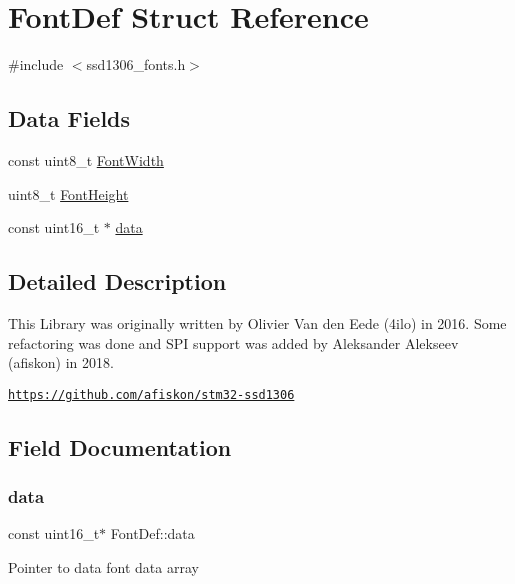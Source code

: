 \hypertarget{struct_font_def}{}\section{Font\+Def Struct Reference}
\label{struct_font_def}


{\ttfamily \#include $<$ssd1306\+\_\+fonts.\+h$>$}

\subsection*{Data Fields}
\begin{DoxyCompactItemize}
\item 
const uint8\+\_\+t \hyperlink{struct_font_def_a9e22d0bdbc21eadba6155f31d742f85f}{Font\+Width}
\item 
uint8\+\_\+t \hyperlink{struct_font_def_a4e3e31a3a441bc010a432564e5da887d}{Font\+Height}
\item 
const uint16\+\_\+t $\ast$ \hyperlink{struct_font_def_a864722845b4def15a6c53bdc4e94a24a}{data}
\end{DoxyCompactItemize}


\subsection{Detailed Description}
This Library was originally written by Olivier Van den Eede (4ilo) in 2016. Some refactoring was done and S\+PI support was added by Aleksander Alekseev (afiskon) in 2018.

\href{https://github.com/afiskon/stm32-ssd1306}{\tt https\+://github.\+com/afiskon/stm32-\/ssd1306} 

\subsection{Field Documentation}
\mbox{\label{struct_font_def_a864722845b4def15a6c53bdc4e94a24a}} 
\subsubsection{\texorpdfstring{data}{data}}
{\footnotesize\ttfamily const uint16\+\_\+t$\ast$ Font\+Def\+::data}

Pointer to data font data array \mbox{\label{struct_font_def_a4e3e31a3a441bc010a432564e5da887d}} 
